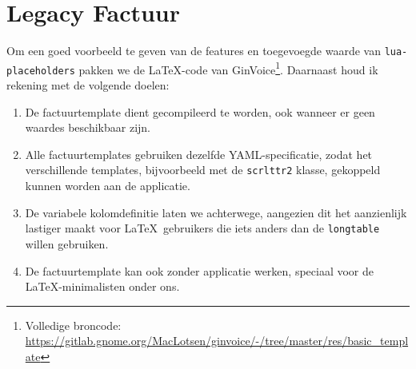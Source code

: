 \documentclass[dutch]{ltugboat}
\def\pkg#1{\texttt{#1}\cite{#1}}
\begin{document}
    \section{Legacy Factuur}
    Om een goed voorbeeld te geven van de features en toegevoegde waarde van \pkg{lua-placeholders} pakken we de \LaTeX-code van GinVoice\footnote{Volledige broncode: \url{https://gitlab.gnome.org/MacLotsen/ginvoice/-/tree/master/res/basic_template}}.
    Daarnaast houd ik rekening met de volgende doelen:
    \begin{enumerate}
        \item De factuurtemplate dient gecompileerd te worden, ook wanneer er geen waardes beschikbaar zijn.
        \item Alle factuurtemplates gebruiken dezelfde YAML-specificatie, zodat het verschillende templates, bijvoorbeeld met de \texttt{scrlttr2} klasse, gekoppeld kunnen worden aan de applicatie.
        \item De variabele kolomdefinitie laten we achterwege, aangezien dit het aanzienlijk lastiger maakt voor \LaTeX\ gebruikers die iets anders dan de \texttt{longtable} willen gebruiken.
        \item De factuurtemplate kan ook zonder applicatie werken, speciaal voor de \LaTeX-minimalisten onder ons.
    \end{enumerate}
\end{document}
